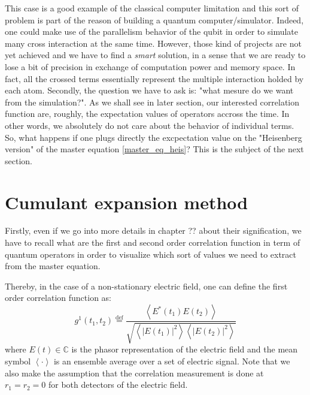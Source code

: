 \documentclass[11pt]{report}
\begin{document}
This case is a good example of the classical computer limitation and this sort of problem is part of the reason of building a quantum computer/simulator. Indeed, one could make use of the parallelism behavior of the qubit in order to simulate many cross interaction at the same time. However, those kind of projects are not yet achieved and we have to find a \textit{smart} solution, in a sense that we are ready to lose a bit of precision in exchange of computation power and memory space. In fact, all the crossed terms essentially represent the multiple interaction holded by each atom. Secondly, the question we have to ask is: "what mesure do we want from the simulation?". As we shall see in later section, our interested correlation function are, roughly, the expectation values of operators accross the time. In other words, we absolutely do not care about the behavior of individual terms. So, what happens if one plugs directly the excpectation value on the "Heisenberg version" of the master equation \eqref{master_eq_heis}? This is the subject of the next section.

\section{Cumulant expansion method}

Firstly, even if we go into more details in chapter ?? about their signification, we have to recall what are the first and second order correlation function in term of quantum operators in order to visualize which sort of values we need to extract from the master equation.

Thereby, in the case of a non-stationary electric field, one can define the first order correlation function as:
\begin{equation}
\label{g1_classic_def}
{\displaystyle g ^{1}(t_{1},t_{2})\stackrel{\text{def}}{=}{\frac {\left\langle E^{*}(t_{1})E(t_{2})\right\rangle }{\sqrt{\left\langle \left|E(t_{1})\right|^{2}\right\rangle \left\langle \left|E(t_{2})\right|^{2}\right\rangle }}}}
\end{equation}
where $E(t) \in \mathbb{C}$ is the phasor representation of the electric field and the mean symbol $\left\langle \cdot \right\rangle$ is an ensemble average over a set of electric signal. Note that we also make the assumption that the correlation measurement is done at $r_1 = r_2 = 0$ for both detectors of the electric field.
\end{document}
